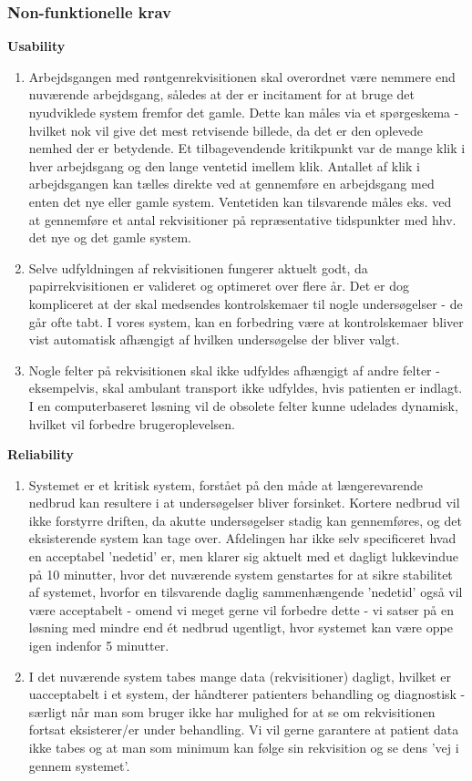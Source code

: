 \subsubsection*{Non-funktionelle krav}
\textbf{Usability}
\begin{enumerate}
  \item Arbejdsgangen med røntgenrekvisitionen skal overordnet være nemmere end
  nuværende arbejdsgang, således at der er incitament for at bruge det
  nyudviklede system fremfor det gamle. Dette kan måles via et spørgeskema -
  hvilket nok vil give det mest retvisende billede, da det er den oplevede
  nemhed der er betydende. Et tilbagevendende kritikpunkt var de mange klik i
  hver arbejdsgang og den lange ventetid imellem klik. Antallet af klik i
  arbejdsgangen kan tælles direkte ved at gennemføre en arbejdsgang med enten
  det nye eller gamle system. Ventetiden kan tilsvarende måles eks. ved at
  gennemføre et antal rekvisitioner på repræsentative tidspunkter med hhv. det
  nye og det gamle system.
  \item Selve udfyldningen af rekvisitionen fungerer aktuelt godt, da
  papirrekvisitionen er valideret og optimeret over flere år. Det er dog
  kompliceret at der skal medsendes kontrolskemaer til nogle undersøgelser - de
  går ofte tabt. I vores system, kan en forbedring være at kontrolskemaer bliver
  vist automatisk afhængigt af hvilken undersøgelse der bliver valgt.
  \item Nogle felter på rekvisitionen skal ikke udfyldes afhængigt af andre
  felter - eksempelvis, skal ambulant transport ikke udfyldes, hvis patienten er
  indlagt. I en computerbaseret løsning vil de obsolete felter kunne udelades
  dynamisk, hvilket vil forbedre brugeroplevelsen.
\end{enumerate}
\textbf{Reliability}
\begin{enumerate}
  \item Systemet er et kritisk system, forstået på den måde at længerevarende
  nedbrud kan resultere i at undersøgelser bliver forsinket. Kortere nedbrud vil
  ikke forstyrre driften, da akutte undersøgelser stadig kan gennemføres, og det
  eksisterende system kan tage over. Afdelingen har ikke selv specificeret hvad
  en acceptabel 'nedetid' er, men klarer sig aktuelt med et dagligt lukkevindue
  på 10 minutter, hvor det nuværende system genstartes for at sikre stabilitet
  af systemet, hvorfor en tilsvarende daglig sammenhængende 'nedetid' også vil
  være acceptabelt - omend vi meget gerne vil forbedre dette - vi satser på en
  løsning med mindre end ét nedbrud ugentligt, hvor systemet kan være oppe igen
  indenfor 5 minutter.
  \item I det nuværende system tabes mange data (rekvisitioner) dagligt, hvilket
  er uacceptabelt i et system, der håndterer patienters behandling og
  diagnostisk - særligt når man som bruger ikke har mulighed for at se om
  rekvisitionen fortsat eksisterer/er under behandling. Vi vil gerne garantere
  at patient data ikke tabes og at man som minimum kan følge sin rekvisition og
  se dens 'vej i gennem systemet'.
\end{enumerate}
